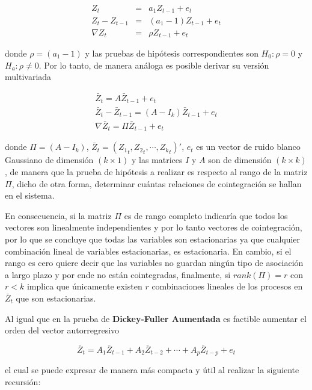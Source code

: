 \begin{eqnarray}
Z_{t} &=& a_1Z_{t-1} + e_t \nonumber \\
Z_{t}- Z_{t-1} &=& (a_1 - 1) Z_{t-1} +e_t \nonumber \\
\nabla Z_t &=& \rho Z_{t-1} + e_t \nonumber
\end{eqnarray}

donde $\rho=(a_1 - 1)$ y las pruebas de hipótesis correspondientes son $H_0: \rho=0$ y $H_a: \rho \neq 0$. Por lo tanto, de manera análoga es posible derivar su versión multivariada 

\begin{eqnarray}
\bar{Z}_t = A \bar{Z}_{t-1} + e_t \nonumber \\
\bar{Z}_t - \bar{Z}_{t-1}= (A- I_k) \bar{Z}_{t-1} + e_t \\
\nabla \bar{Z}_t = \Pi\bar{Z}_{t-1} + e_t \nonumber 
\end{eqnarray}

donde $\Pi= (A-I_k)$, $\bar{Z}_t= \left ( {Z_1}_t, {Z_2}_t, \cdots, {Z_k}_t \right )'$,  $e_t$ es un  vector de ruido blanco Gaussiano de dimensión $(k \times 1)$ y las matrices $I$ y $A$ son de dimensión $(k \times k)$, de manera que la prueba de hipótesis a realizar es respecto al rango de la matriz $\Pi$, dicho de otra forma, determinar cuántas relaciones de cointegración se hallan en el sistema.\bigskip 

 En consecuencia, si la matriz $\Pi$ es de rango completo indicaría que todos los vectores son linealmente independientes y por lo tanto vectores de cointegración, por lo que se concluye que todas las variables son estacionarias  ya que cualquier combinación lineal de variables estacionarias, es estacionaria. En cambio, si el rango es cero quiere decir que las variables no guardan ningún tipo de asociación a largo plazo y por ende no están cointegradas, finalmente, si $rank(\Pi)=r$ con $r<k$ implica que únicamente existen $r$ combinaciones lineales de los procesos en $\bar{Z}_t$  que son estacionarias.\bigskip 
 
 Al igual que en la prueba de \textbf{Dickey-Fuller Aumentada} es factible aumentar el orden del vector autorregresivo
 
 \begin{equation}
 \bar{Z}_t= A_1\bar{Z}_{t-1} + A_2\bar{Z}_{t-2}+ \cdots + A_p\bar{Z}_{t-p} +e_t
 \end{equation} 
 
 el cual se puede expresar de manera más compacta y útil al realizar la siguiente recursión:\bigskip 
 
